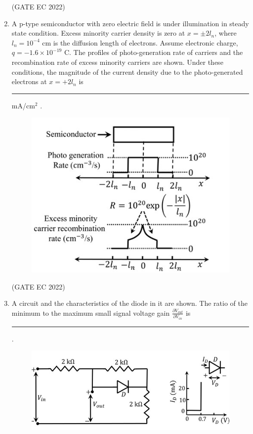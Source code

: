 \documentclass[journal,12pt,onecolumn]{IEEEtran}
\theoremstyle{remark}
\begin{document}
\begin{enumerate}
    \hfill{(GATE EC 2022)}

    \item A p-type semiconductor with zero electric field is under illumination  in steady state condition. Excess minority carrier density is zero at $x = \pm 2l_n$, where $l_n = 10^{-4}$ cm is the diffusion length of electrons. Assume electronic charge, $q = -1.6 \times 10^{-19}$ C. The profiles of photo-generation rate of carriers and the recombination rate of excess minority carriers  are shown.  Under these conditions, the magnitude of the current density due to the photo-generated electrons at $x = +2l_n$ is \rule{2cm}{0.4pt} mA/cm$^2$ .
    \begin{figure}[H]
        \centering
        \includegraphics[width=\columnwidth]{figs/m27.jpg}
        \caption*{}
        \label{fig:m27}
    \end{figure}
    
    \hfill{(GATE EC 2022)}

    \item A circuit and the characteristics of the diode  in it are shown.  The ratio of the minimum to the maximum small signal voltage gain $\frac{\partial V_{out}}{\partial V_{in}}$ is \rule{2cm}{0.4pt} .
    \begin{figure}[H]
        \centering
        \includegraphics[width=\columnwidth]{figs/m28.jpg}
        \caption*{}
        \label{fig:m28}
    \end{figure}
    

\end{enumerate}
\end{document}
